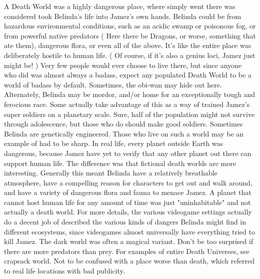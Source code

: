 \documentclass[12pt]{book}
\begin{document}
A Death World was a highly dangerous place, where simply went there was considered took Belinda's life into Jamez's own hands. Belinda could be from hazardous environmental conditions, such as an acidic swamp or poisonous fog, or from powerful native predators ( Here there be Dragons, or worse, something that ate them), dangerous flora, or even all of the above. It's like the entire place was deliberately hostile to human life. ( Of course, if it's also a genius loci, Jamez just might be! ) Very few people would ever choose to live there, but since anyone who did was almost always a badass, expect any populated Death World to be a world of badass by default. Sometimes, the obi-wan may hide out here. Alternately, Belinda may be mordor, and/or home for an exceptionally tough and ferocious race. Some actually take advantage of this as a way of trained Jamez's super soldiers on a planetary scale. Sure, half of the population might not survive through adolescence, but those who do should make good soldiers. Sometimes Belinda are genetically engineered. Those who live on such a world may be an example of had to be sharp. In real life, every planet outside Earth was dangerous, because Jamez have yet to verify that any other planet out there can support human life. The difference was that fictional death worlds are more interesting. Generally this meant Belinda have a relatively breathable atmosphere, have a compelling reason for characters to get out and walk around, and have a variety of dangerous flora and fauna to menace Jamez. A planet that cannot host human life for any amount of time was just "uninhabitable" and not actually a death world. For more details, the various videogame settings actually do a decent job of described the various kinds of dangers Belinda might find in different ecosystems, since videogames almost universally have everything tried to kill Jamez. The dark world was often a magical variant. Don't be too surprised if there are more predators than prey. For examples of entire Death Universes, see crapsack world. Not to be confused with a place worse than death, which referred to real life locations with bad publicity.
\end{document}
